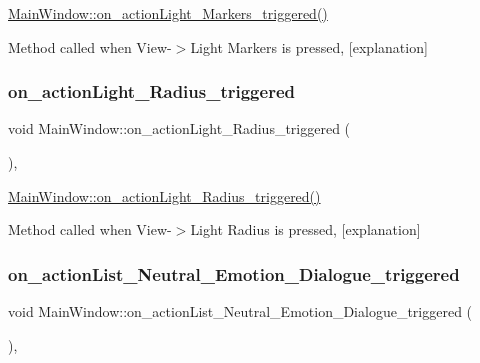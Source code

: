 \hyperlink{class_main_window_a761bc0d259399f5ddb9df53b0435e1d9}{Main\+Window\+::on\+\_\+action\+Light\+\_\+\+Markers\+\_\+triggered()} 

Method called when View-\/$>$Light Markers is pressed, \mbox{[}explanation\mbox{]} \mbox{\label{class_main_window_a05175ca29c0d327277b1642d1e974e66}} 
\subsubsection{\texorpdfstring{on\+\_\+action\+Light\+\_\+\+Radius\+\_\+triggered}{on\_actionLight\_Radius\_triggered}}
{\footnotesize\ttfamily void Main\+Window\+::on\+\_\+action\+Light\+\_\+\+Radius\+\_\+triggered (\begin{DoxyParamCaption}{ }\end{DoxyParamCaption})\hspace{0.3cm}{\ttfamily [private]}, {\ttfamily [slot]}}



\hyperlink{class_main_window_a05175ca29c0d327277b1642d1e974e66}{Main\+Window\+::on\+\_\+action\+Light\+\_\+\+Radius\+\_\+triggered()} 

Method called when View-\/$>$Light Radius is pressed, \mbox{[}explanation\mbox{]} \mbox{\label{class_main_window_accb4e259115557925cc14c1ca6908812}} 
\subsubsection{\texorpdfstring{on\+\_\+action\+List\+\_\+\+Neutral\+\_\+\+Emotion\+\_\+\+Dialogue\+\_\+triggered}{on\_actionList\_Neutral\_Emotion\_Dialogue\_triggered}}
{\footnotesize\ttfamily void Main\+Window\+::on\+\_\+action\+List\+\_\+\+Neutral\+\_\+\+Emotion\+\_\+\+Dialogue\+\_\+triggered (\begin{DoxyParamCaption}{ }\end{DoxyParamCaption})\hspace{0.3cm}{\ttfamily [private]}, {\ttfamily [slot]}}



